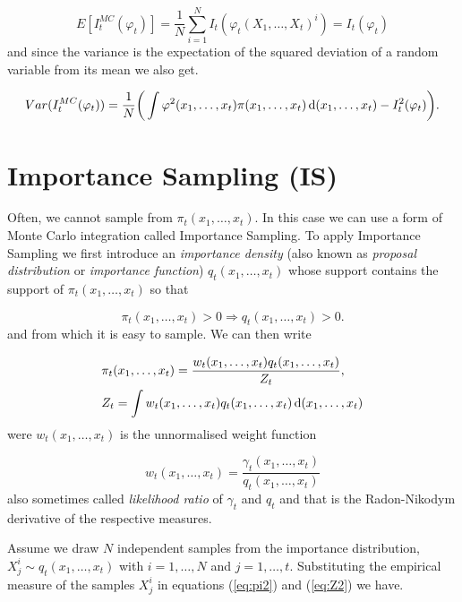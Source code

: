 \begin{equation*}
    E[I^{MC}_t(\varphi_t)] = \frac{1}{N} \sum_{i=1}^N I_t(\varphi_t(X_1, \dots, X_t)^i) = I_t(\varphi_t)
\end{equation*}
and since the variance is the expectation of the squared deviation of a random variable from its mean we also get.

\begin{equation*}
    Var(I^{MC}_t(\varphi_t)) = \frac{1}{N} \bigg( \int \varphi^2(x_1, \dots, x_t) \pi(x_1, \dots, x_t) \operatorname{d}\!{(}x_1, \dots, x_t) - I^2_t(\varphi_t)\bigg).
\end{equation*}

\section{Importance Sampling (IS)}

Often, we cannot sample from $\pi_t (x_1, \dots, x_t)$. In this case we can use a form of Monte Carlo integration called Importance Sampling. To apply Importance Sampling we first introduce an \textit{importance density} (also known as \textit{proposal distribution} or \textit{importance function}) $q_t(x_1, \dots, x_t)$ whose support contains the support of $\pi_t (x_1, \dots, x_t)$ so that

\begin{equation*}
    \pi_t(x_1, \dots, x_t) > 0 \Rightarrow q_t(x_1, \dots, x_t) > 0.
\end{equation*}
and from which it is easy to sample. We can then write

\begin{align} \label{eq:pi2}
    &\pi_t(x_1, \dots, x_t) = \frac{w_t(x_1, \dots, x_t)q_t(x_1, \dots, x_t)}{Z_t}, \\
    &Z_t = \int w_t(x_1, \dots, x_t)q_t(x_1, \dots, x_t) \operatorname{d}\!{(}x_1, \dots, x_t) \label{eq:Z2}
\end{align}
were $w_t(x_1, \dots, x_t)$ is the unnormalised weight function

\begin{equation}
    w_t(x_1, \dots, x_t) = \frac{\gamma_t(x_1, \dots, x_t)}{q_t(x_1, \dots, x_t)}
\end{equation}
also sometimes called \textit{likelihood ratio} of $\gamma_t$ and $q_t$ and that is the Radon-Nikodym derivative of the respective measures.

Assume we draw $N$ independent samples from the importance distribution, $X^i_j \sim q_t(x_1, \dots, x_t)$ with $i = 1, \dots, N$ and $j = 1, \dots, t$. Substituting the empirical measure of the samples $X^i_j$ in equations (\ref{eq:pi2}) and (\ref{eq:Z2}) we have.

